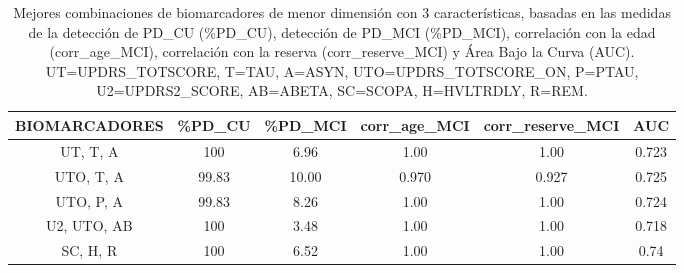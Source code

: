 \begin{table}[H]
	\centering
	\begin{adjustbox}{max width=\textwidth}
		\begin{tabular}{|c|c|c|c|c|c|}
			\hline
			\textbf{BIOMARCADORES} & \textbf{\%PD\_CU} & \textbf{\%PD\_MCI} & \textbf{corr\_age\_MCI} & \textbf{corr\_reserve\_MCI} & \textbf{AUC} \\ \hline
			UT, T, A & 100 & 6.96 & 1.00 & 1.00 & 0.723 \\ \hline
			UTO, T, A & 99.83 & 10.00 & 0.970 & 0.927 & 0.725 \\ \hline
			UTO, P, A & 99.83 & 8.26 & 1.00 & 1.00 & 0.724 \\ \hline
			U2, UTO, AB & 100 & 3.48 & 1.00 & 1.00 & 0.718 \\ \hline
			SC, H, R & 100 & 6.52 & 1.00 & 1.00 & 0.74 \\ \hline
		\end{tabular}
	\end{adjustbox}
	\caption{Mejores combinaciones de biomarcadores de menor dimensión con 3 características, basadas en las medidas de la detección de PD\_CU (\%PD\_CU), detección de PD\_MCI (\%PD\_MCI), correlación con la edad (corr\_age\_MCI), correlación con la reserva (corr\_reserve\_MCI) y Área Bajo la Curva (AUC). UT=UPDRS\_TOTSCORE, T=TAU, A=ASYN, UTO=UPDRS\_TOTSCORE\_ON, P=PTAU, U2=UPDRS2\_SCORE, AB=ABETA, SC=SCOPA, H=HVLTRDLY, R=REM.}
	\label{tab:LEASPY3}
\end{table}

